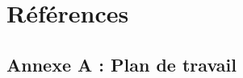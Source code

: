 \documentclass[a4paper, oneside, 12pt, titlepage]{article}
\begin{document}
\section{Références}


\renewcommand*{\refname}{\vspace*{-1em}}\vspace*{-1em}

\nocite{*}



\begin{landscape}
\thispagestyle{empty}

\section{Annexe A : Plan de travail}

%


\end{landscape}
\end{document}
